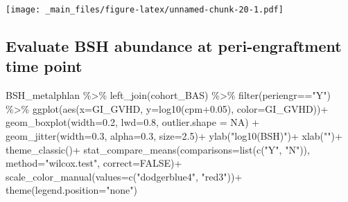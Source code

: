 \documentclass[
]{book}
\newenvironment{Shaded}{\begin{snugshade}}{\end{snugshade}}
\newcommand{\AttributeTok}[1]{\textcolor[rgb]{0.77,0.63,0.00}{#1}}
\newcommand{\ConstantTok}[1]{\textcolor[rgb]{0.00,0.00,0.00}{#1}}
\newcommand{\FloatTok}[1]{\textcolor[rgb]{0.00,0.00,0.81}{#1}}
\newcommand{\FunctionTok}[1]{\textcolor[rgb]{0.00,0.00,0.00}{#1}}
\newcommand{\NormalTok}[1]{#1}
\newcommand{\SpecialCharTok}[1]{\textcolor[rgb]{0.00,0.00,0.00}{#1}}
\newcommand{\StringTok}[1]{\textcolor[rgb]{0.31,0.60,0.02}{#1}}
\begin{document}
\texttt{[image: \_main\_files/figure-latex/unnamed-chunk-20-1.pdf]}

\hypertarget{evaluate-bsh-abundance-at-peri-engraftment-time-point}{%
\subsection{Evaluate BSH abundance at peri-engraftment time point}\label{evaluate-bsh-abundance-at-peri-engraftment-time-point}}

\begin{Shaded}
\begin{Highlighting}[]
\NormalTok{BSH\_metalphlan }\SpecialCharTok{\%\textgreater{}\%} 
  \FunctionTok{left\_join}\NormalTok{(cohort\_BAS) }\SpecialCharTok{\%\textgreater{}\%} 
  \FunctionTok{filter}\NormalTok{(periengr}\SpecialCharTok{==}\StringTok{"Y"}\NormalTok{) }\SpecialCharTok{\%\textgreater{}\%} 
  \FunctionTok{ggplot}\NormalTok{(}\FunctionTok{aes}\NormalTok{(}\AttributeTok{x=}\NormalTok{GI\_GVHD, }\AttributeTok{y=}\FunctionTok{log10}\NormalTok{(cpm}\FloatTok{+0.05}\NormalTok{), }\AttributeTok{color=}\NormalTok{GI\_GVHD))}\SpecialCharTok{+}
  \FunctionTok{geom\_boxplot}\NormalTok{(}\AttributeTok{width=}\FloatTok{0.2}\NormalTok{, }\AttributeTok{lwd=}\FloatTok{0.8}\NormalTok{, }\AttributeTok{outlier.shape =} \ConstantTok{NA}\NormalTok{) }\SpecialCharTok{+}
  \FunctionTok{geom\_jitter}\NormalTok{(}\AttributeTok{width=}\FloatTok{0.3}\NormalTok{, }\AttributeTok{alpha=}\FloatTok{0.3}\NormalTok{, }\AttributeTok{size=}\FloatTok{2.5}\NormalTok{)}\SpecialCharTok{+}
  \FunctionTok{ylab}\NormalTok{(}\StringTok{"log10(BSH)"}\NormalTok{)}\SpecialCharTok{+}
  \FunctionTok{xlab}\NormalTok{(}\StringTok{""}\NormalTok{)}\SpecialCharTok{+}
  \FunctionTok{theme\_classic}\NormalTok{()}\SpecialCharTok{+}
  \FunctionTok{stat\_compare\_means}\NormalTok{(}\AttributeTok{comparisons=}\FunctionTok{list}\NormalTok{(}\FunctionTok{c}\NormalTok{(}\StringTok{"Y"}\NormalTok{, }\StringTok{"N"}\NormalTok{)),}
                     \AttributeTok{method=}\StringTok{"wilcox.test"}\NormalTok{,}
                     \AttributeTok{correct=}\ConstantTok{FALSE}\NormalTok{)}\SpecialCharTok{+}
  \FunctionTok{scale\_color\_manual}\NormalTok{(}\AttributeTok{values=}\FunctionTok{c}\NormalTok{(}\StringTok{"dodgerblue4"}\NormalTok{, }\StringTok{"red3"}\NormalTok{))}\SpecialCharTok{+}
  \FunctionTok{theme}\NormalTok{(}\AttributeTok{legend.position=}\StringTok{"none"}\NormalTok{)}
\end{Highlighting}
\end{Shaded}
\end{document}
